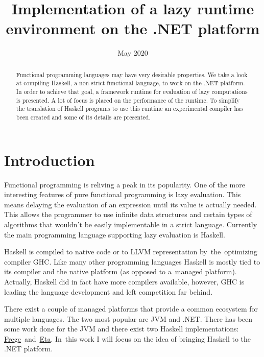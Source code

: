 \documentclass[en]{pracamgr}
\title{Implementation of a lazy runtime environment on the .NET platform}
\date{May 2020}
\begin{document}
\maketitle

\begin{abstract}
  Functional programming languages may have very desirable properties.
We take a look at compiling Haskell, a non-strict functional language,
to work on the .NET platform. In order to achieve that goal, a framework
runtime for evaluation of lazy computations is presented. A lot of focus
is placed on the performance of the runtime. To simplify the translation
of Haskell programs to use this runtime an experimental compiler has been
created and some of its details are presented.
\end{abstract}

\tableofcontents

\chapter*{Introduction}

Functional programming is reliving a peak in its popularity.
One of the more interesting features of pure functional programming
is lazy evaluation. This means delaying the evaluation of an expression
until its value is actually needed. This allows the programmer to use
infinite data structures and certain types of algorithms that wouldn't
be easily implementable in a strict language.
Currently the main programming language
supporting lazy evaluation is Haskell.

Haskell is compiled to native code or to LLVM representation by~the~optimizing
compiler GHC. Like many other programming languages Haskell is mostly
tied to its compiler and the native platform (as opposed to a~managed platform).
Actually, Haskell did in fact have more compilers available, however,
GHC is leading the language development and left competition far behind.

There exist a couple of managed platforms that provide a common ecosystem
for multiple languages. The two most popular are JVM and .NET.
There has been some work done for the JVM \cite{Tullsen} \cite{Choi} \cite{Stewart}
and there exist two Haskell implementations: 
\href{https://github.com/Frege/frege}{Frege}~and~\href{https://eta-lang.org/}{Eta}.
In~this work I will focus on the idea of bringing
Haskell to the .NET platform.
\end{document}
